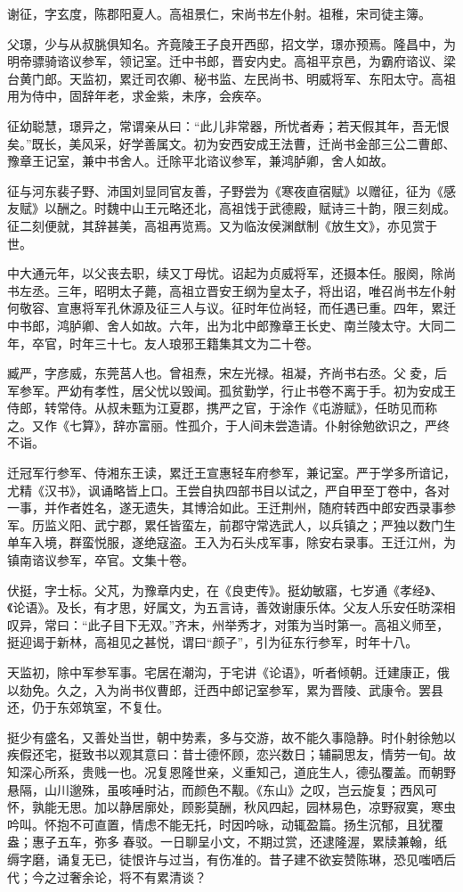 \documentclass[12pt,UTF8]{ctexbook}
\begin{document}
谢征，字玄度，陈郡阳夏人。高祖景仁，宋尚书左仆射。祖稚，宋司徒主簿。

父璟，少与从叔朓俱知名。齐竟陵王子良开西邸，招文学，璟亦预焉。隆昌中，为明帝骠骑谘议参军，领记室。迁中书郎，晋安内史。高祖平京邑，为霸府谘议、梁台黄门郎。天监初，累迁司农卿、秘书监、左民尚书、明威将军、东阳太守。高祖用为侍中，固辞年老，求金紫，未序，会疾卒。

征幼聪慧，璟异之，常谓亲从曰：“此儿非常器，所忧者寿；若天假其年，吾无恨矣。”既长，美风采，好学善属文。初为安西安成王法曹，迁尚书金部三公二曹郎、豫章王记室，兼中书舍人。迁除平北谘议参军，兼鸿胪卿，舍人如故。

征与河东裴子野、沛国刘显同官友善，子野尝为《寒夜直宿赋》以赠征，征为《感友赋》以酬之。时魏中山王元略还北，高祖饯于武德殿，赋诗三十韵，限三刻成。征二刻便就，其辞甚美，高祖再览焉。又为临汝侯渊猷制《放生文》，亦见赏于世。

中大通元年，以父丧去职，续又丁母忧。诏起为贞威将军，还摄本任。服阕，除尚书左丞。三年，昭明太子薨，高祖立晋安王纲为皇太子，将出诏，唯召尚书左仆射何敬容、宣惠将军孔休源及征三人与议。征时年位尚轻，而任遇已重。四年，累迁中书郎，鸿胪卿、舍人如故。六年，出为北中郎豫章王长史、南兰陵太守。大同二年，卒官，时年三十七。友人琅邪王籍集其文为二十卷。

臧严，字彦威，东莞莒人也。曾祖焘，宋左光禄。祖凝，齐尚书右丞。父夌，后军参军。严幼有孝性，居父忧以毁闻。孤贫勤学，行止书卷不离于手。初为安成王侍郎，转常侍。从叔未甄为江夏郡，携严之官，于涂作《屯游赋》，任昉见而称之。又作《七算》，辞亦富丽。性孤介，于人间未尝造请。仆射徐勉欲识之，严终不诣。

迁冠军行参军、侍湘东王读，累迁王宣惠轻车府参军，兼记室。严于学多所谙记，尤精《汉书》，讽诵略皆上口。王尝自执四部书目以试之，严自甲至丁卷中，各对一事，并作者姓名，遂无遗失，其博洽如此。王迁荆州，随府转西中郎安西录事参军。历监义阳、武宁郡，累任皆蛮左，前郡守常选武人，以兵镇之；严独以数门生单车入境，群蛮悦服，遂绝寇盗。王入为石头戍军事，除安右录事。王迁江州，为镇南谘议参军，卒官。文集十卷。

伏挺，字士标。父芃，为豫章内史，在《良吏传》。挺幼敏寤，七岁通《孝经》、《论语》。及长，有才思，好属文，为五言诗，善效谢康乐体。父友人乐安任昉深相叹异，常曰：“此子目下无双。”齐末，州举秀才，对策为当时第一。高祖义师至，挺迎谒于新林，高祖见之甚悦，谓曰“颜子”，引为征东行参军，时年十八。

天监初，除中军参军事。宅居在潮沟，于宅讲《论语》，听者倾朝。迁建康正，俄以劾免。久之，入为尚书仪曹郎，迁西中郎记室参军，累为晋陵、武康令。罢县还，仍于东郊筑室，不复仕。

挺少有盛名，又善处当世，朝中势素，多与交游，故不能久事隐静。时仆射徐勉以疾假还宅，挺致书以观其意曰：昔士德怀顾，恋兴数日；辅嗣思友，情劳一旬。故知深心所系，贵贱一也。况复恩隆世亲，义重知己，道庇生人，德弘覆盖。而朝野悬隔，山川邈殊，虽咳唾时沾，而颜色不觏。《东山》之叹，岂云旋复；西风可怀，孰能无思。加以静居廓处，顾影莫酬，秋风四起，园林易色，凉野寂寞，寒虫吟叫。怀抱不可直置，情虑不能无托，时因吟咏，动辄盈篇。扬生沉郁，且犹覆盎；惠子五车，弥多春驳。一日聊呈小文，不期过赏，还逮隆渥，累牍兼翰，纸缛字磨，诵复无已，徒恨许与过当，有伤准的。昔子建不欲妄赞陈琳，恐见嗤哂后代；今之过奢余论，将不有累清谈？
\end{document}

